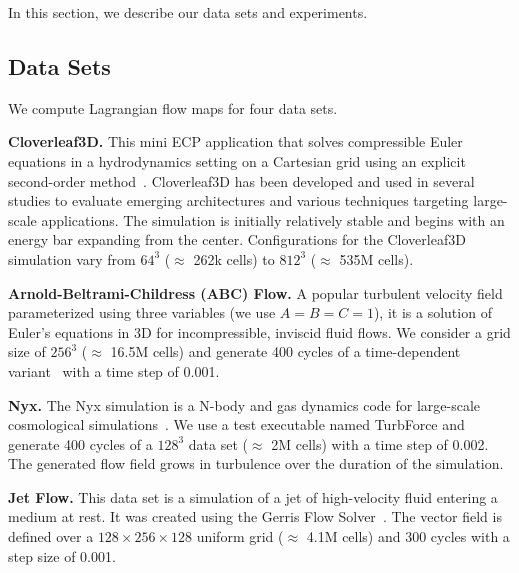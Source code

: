 In this section, we describe our data sets and experiments.
%
\subsection{Data Sets}
We compute Lagrangian flow maps for four data sets.

\textbf{Cloverleaf3D.} This mini ECP application that solves compressible Euler equations in a hydrodynamics setting on a Cartesian grid using an explicit second-order method~\cite{mallinson2013cloverleaf}.
%
Cloverleaf3D has been developed and used in several studies to evaluate emerging architectures and various techniques targeting large-scale applications.
%
The simulation is initially relatively stable and begins with an energy bar expanding from the center.
%
Configurations for the Cloverleaf3D simulation vary from $64^{3}$ ($\approx$ 262k cells) to $812^{3}$ ($\approx$ 535M cells).

\textbf{Arnold-Beltrami-Childress (ABC) Flow.} A popular turbulent velocity field parameterized using three variables (we use $A=B=C=1$), it is a solution of Euler's equations in 3D for incompressible, inviscid fluid flows. 
%
%
We consider a grid size of $256^{3}$ ($\approx$ 16.5M cells) and generate 400 cycles of a time-dependent variant~\cite{brummell2001linear} with a time step of 0.001.

\textbf{Nyx.} The Nyx simulation is a N-body and gas dynamics code for large-scale cosmological simulations~\cite{almgren2013nyx}. 
%
We use a test executable named TurbForce and generate 400 cycles of a $128^3$ data set ($\approx$ 2M cells) with a time step of 0.002.
%
The generated flow field grows in turbulence over the duration of the simulation. 

\textbf{Jet Flow.} This data set is a simulation of a jet of high-velocity fluid entering a medium at rest. 
%
It was created using the Gerris Flow Solver~\cite{popinet2003gerris}.
%
The vector field is defined over a $128\times256\times128$ uniform grid ($\approx$ 4.1M cells) and 300 cycles with a step size of 0.001.
%
